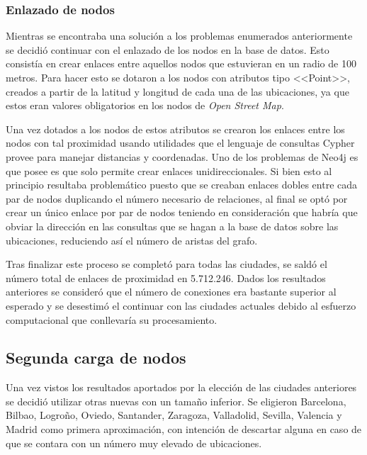 \subsubsection{Enlazado de nodos}

Mientras se encontraba una solución a los problemas enumerados anteriormente se decidió continuar con el enlazado de los nodos en la base de datos. Esto consistía en crear enlaces entre aquellos nodos que estuvieran en un radio de 100 metros. Para hacer esto se dotaron a los nodos con atributos tipo <<Point>>, creados a partir de la latitud y longitud de cada una de las ubicaciones, ya que estos eran valores obligatorios en los nodos de \textit{Open Street Map}.


 Una vez dotados a los nodos de estos atributos se crearon los enlaces entre los nodos con tal proximidad usando utilidades que el lenguaje de consultas Cypher provee para manejar distancias y coordenadas. Uno de los problemas de Neo4j es que posee es que solo permite crear enlaces unidireccionales. Si bien esto al principio resultaba problemático puesto que se creaban enlaces dobles entre cada par de nodos duplicando el número necesario de relaciones, al final se optó por crear un único enlace por par de nodos teniendo en consideración que habría que obviar la dirección en las consultas que se hagan a la base de datos sobre las ubicaciones, reduciendo así el número de aristas del grafo.
 
  Tras finalizar este proceso se completó para todas las ciudades, se saldó el número total de enlaces de proximidad en 5.712.246. Dados los resultados anteriores se consideró que el número de conexiones era bastante superior al esperado y se desestimó el continuar con las ciudades actuales debido al esfuerzo computacional que conllevaría su procesamiento.


\subsection{Segunda carga de nodos}

Una vez vistos los resultados aportados por la elección de las ciudades anteriores se decidió utilizar otras nuevas con un tamaño inferior. Se eligieron Barcelona, Bilbao, Logroño, Oviedo, Santander, Zaragoza, Valladolid, Sevilla, Valencia y Madrid como primera aproximación, con intención de descartar alguna en caso de que se contara con un número muy elevado de ubicaciones.

